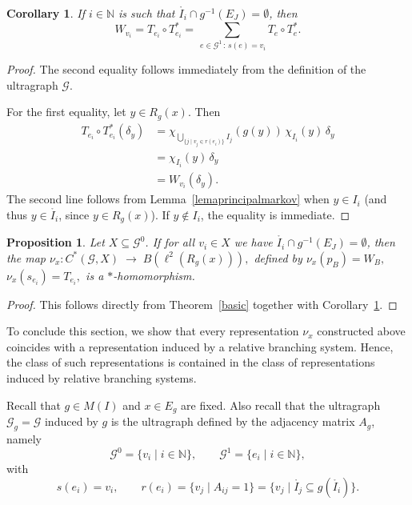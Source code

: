 \documentclass[12pt, reqno]{amsart}
\newtheorem{proposition}[theorem]{Proposition}
\newtheorem{corollary}[theorem]{Corollary}
\theoremstyle{definition}
\theoremstyle{remark}
\numberwithin{equation}{section}
\begin{document}
\begin{corollary}\label{CK4}
    If $i \in \mathbb{N}$ is such that 
    $\mathring{I_i} \cap g^{-1}(E_J) = \emptyset$, 
    then
    \[
    W_{v_i} 
       = T_{e_i} \circ T_{e_i}^* 
       = \sum_{\,e \in \mathcal{G}^1 \,:\, s(e) = v_i} 
         T_{e} \circ T_{e}^*.
    \]
\end{corollary}

\begin{proof}
The second equality follows immediately from the definition of the ultragraph 
$\mathcal{G}$.  

For the first equality, let $y \in R_g(x)$. Then
\begin{align*}
    T_{e_i} \circ T_{e_i}^*(\delta_y) 
       &= \chi_{\bigcup_{\{j \mid v_j \in r(e_i)\}} I_j}(g(y))\,
          \chi_{I_i}(y)\,\delta_y \\
       &= \chi_{I_i}(y)\,\delta_y \\
       &= W_{v_i}(\delta_y).
\end{align*}
The second line follows from Lemma~\ref{lemaprincipalmarkov} when 
$y \in I_i$ (and thus $y \in \mathring{I_i}$, since $y \in R_g(x)$). 
If $y \notin I_i$, the equality is immediate. 
\end{proof}


\begin{proposition}\label{repMarkov}
    Let $X \subseteq \mathcal{G}^0$. 
    If for all $v_i \in X$ we have 
    $\mathring{I_i} \cap g^{-1}(E_J) = \emptyset$, 
    then the map $
    \nu_x: C^*(\mathcal{G}, X) \;\longrightarrow\; B(\ell^2(R_g(x))),
    $
    defined by
    $
    \nu_x(p_B) = W_B,$ $
    \nu_x(s_{e_i}) = T_{e_i},
    $
    is a $*$-homomorphism.
\end{proposition}

\begin{proof}
This follows directly from Theorem~\ref{basic} together with 
Corollary~\ref{CK4}.
\end{proof}


To conclude this section, we show that every representation $\nu_x$ constructed above coincides with a representation induced by a relative branching system. 
Hence, the class of such representations is contained in the class of representations induced by relative branching systems.  

Recall that $g \in M(I)$ and $x \in E_g$ are fixed. 
Also recall that the ultragraph $\mathcal{G}_g = \mathcal{G}$ induced by $g$ is the ultragraph defined by the adjacency matrix $A_g$, namely
\[
\mathcal{G}^0 = \{v_i \mid i \in \mathbb{N} \}, 
\qquad 
\mathcal{G}^1 = \{e_i \mid i \in \mathbb{N} \},
\]
with
\[
s(e_i) = v_i,
\qquad 
r(e_i) = \{v_j \mid A_{ij} = 1\} 
        = \{v_j \mid \mathring{I_j} \subseteq g(\mathring{I_i})\}.
\]
\end{document}
